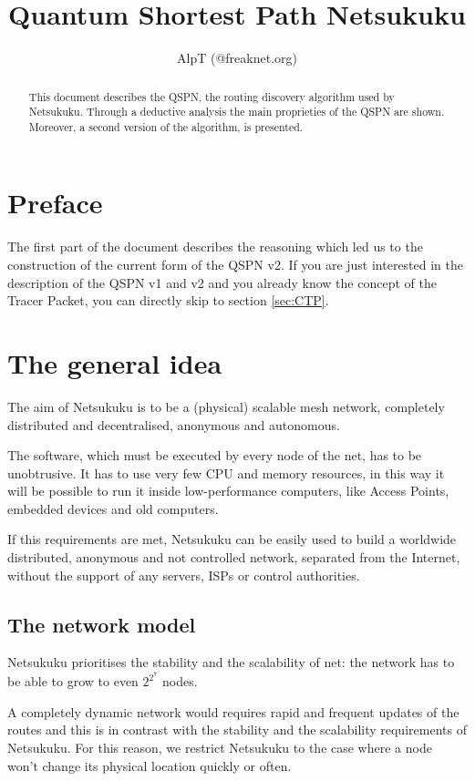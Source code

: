 \documentclass[a4paper]{article}
\title{Quantum Shortest Path Netsukuku}
\author{AlpT (@freaknet.org)}
\begin{document}
\maketitle

\begin{abstract}
	This document describes the QSPN, the routing discovery algorithm used
	by Netsukuku.
	Through a deductive analysis the main proprieties of the QSPN are
	shown. Moreover, a second version of the algorithm, is presented.
\end{abstract}

\section{Preface}
\label{sec:preface}

The first part of the document describes the reasoning which led us to the
construction of the current form of the QSPN v2.
If you are just interested in the description of the QSPN v1 and v2 and you
already know the concept of the Tracer Packet, you can directly skip to
section \ref{sec:CTP}.

\section{The general idea}
\label{sec:general_idea}

The aim of Netsukuku is to be a (physical) scalable mesh network, completely
distributed and decentralised, anonymous and autonomous.

The software, which must be executed by every node of the net, has to be
unobtrusive. It has to use very few CPU and memory resources, in this way it
will be possible to run it inside low-performance computers, like Access Points,
embedded devices and old computers.

If this requirements are met, Netsukuku can be easily used to build a worldwide
distributed, anonymous and not controlled network, separated from the
Internet, without the support of any servers, ISPs or control authorities.

\subsection{The network model}
\label{sec:net_model}

Netsukuku prioritises the stability and the scalability of net: the network
has to be able to grow to even $2^{2^7}$ nodes.

A completely dynamic network would requires rapid and frequent updates
of the routes and this is in contrast with the stability and the scalability
requirements of Netsukuku.
For this reason, we restrict Netsukuku to the case where a node won't change
its physical location quickly or often.
\end{document}
